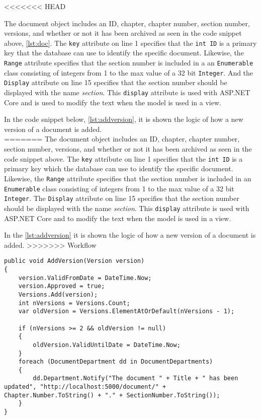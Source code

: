<<<<<<< HEAD


The document object includes an ID, chapter, chapter number, section number, versions, and whether or not it has been archived as seen in the code snippet above, \cref{lst:doc}.
The \texttt{key} attribute on line 1 specifies that the \texttt{int ID} is a primary key that the database can use to identify the specific document.
Likewise, the \texttt{Range} attribute specifies that the section number is included in a an \texttt{Enumerable} class consisting of integers from 1 to the max value of a 32 bit \texttt{Integer}.
And the \texttt{Display} attribute on line 15 specifies that the section number should be displayed with the name \textit{section}.
This \texttt{display} attribute is used with ASP.NET Core and is used to modify the text when the model is used in a view.

In the code snippet below, \cref{lst:addversion}, it is shown the logic of how a new version of a document is added.
\\
=======
The document object includes an ID, chapter, chapter number, section number, 
versions, and whether or not it has been archived as seen in the code snippet above.
The \texttt{key} attribute on line 1 specifies that the \texttt{int ID} is a primary key which the database can use to identify the specific document.
Likewise, the \texttt{Range} attribute specifies that the section number is included in an \texttt{Enumerable} class consisting of integers from 1 to the max value of a 32 bit \texttt{Integer}.
The \texttt{Display} attribute on line 15 specifies that the section number should be displayed with the name \textit{section}.
This \texttt{display} attribute is used with ASP.NET Core and to modify the text when the model is used in a view.

In the \cref{lst:addversion} it is shown the logic of how a new version of a document is added.
>>>>>>> Workflow

\begin{lstlisting}[caption={Document Model: AddVersion}, label={lst:addversion}]
public void AddVersion(Version version)
{
	version.ValidFromDate = DateTime.Now;
	version.Approved = true;
	Versions.Add(version);
	int nVersions = Versions.Count;
	var oldVersion = Versions.ElementAtOrDefault(nVersions - 1);

	if (nVersions >= 2 && oldVersion != null)
	{
		oldVersion.ValidUntilDate = DateTime.Now;
	}
	foreach (DocumentDepartment dd in DocumentDepartments)
	{
		dd.Department.Notify("The document " + Title + " has been updated", "http://localhost:5000/document/" + Chapter.Number.ToString() + "." + SectionNumber.ToString());
	}
}
\end{lstlisting}


